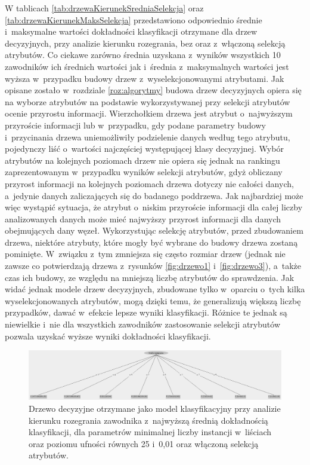 \documentclass[a4paper,twoside,12pt]{book}
\begin{document}
W tablicach \ref{tab:drzewaKierunekSredniaSelekcja} oraz \ref{tab:drzewaKierunekMaksSelekcja} przedstawiono odpowiednio średnie i~maksymalne wartości dokładności klasyfikacji otrzymane dla drzew decyzyjnych, przy analizie kierunku rozegrania, bez oraz z~włączoną selekcją atrybutów. Co ciekawe zarówno średnia uzyskana z~wyników wszystkich 10 zawodników ich średnich wartości jak i~średnia z~maksymalnych wartości jest wyższa w~przypadku budowy drzew z~wyselekcjonowanymi atrybutami. Jak opisane zostało w~rozdziale \ref{roz:algorytmy} budowa drzew decyzyjnych opiera się na wyborze atrybutów na podstawie wykorzystywanej przy selekcji atrybutów ocenie przyrostu informacji. Wierzchołkiem drzewa jest atrybut o~najwyższym przyroście informacji lub w~przypadku, gdy podane parametry budowy i~przycinania drzewa uniemożliwiły podzielenie danych według tego atrybutu, pojedynczy liść o~wartości najczęściej występującej klasy decyzyjnej. Wybór atrybutów na kolejnych poziomach drzew nie opiera się jednak na rankingu zaprezentowanym w~przypadku wyników selekcji atrybutów, gdyż obliczany przyrost informacji na kolejnych poziomach drzewa dotyczy nie całości danych, a~jedynie danych zaliczających się do badanego poddrzewa. Jak najbardziej może więc wystąpić sytuacja, że atrybut o~niskim przyroście informacji dla całej liczby analizowanych danych może mieć najwyższy przyrost informacji dla danych obejmujących dany węzeł. Wykorzystując selekcję atrybutów, przed zbudowaniem drzewa, niektóre atrybuty, które mogły być wybrane do budowy drzewa zostaną pominięte. W~związku z~tym zmniejsza się często rozmiar drzew (jednak nie zawsze co potwierdzają drzewa z~rysunków \ref{fig:drzewo1} i~\ref{fig:drzewo3}), a~także czas ich budowy, ze względu na mniejszą liczbę atrybutów do sprawdzenia. Jak widać jednak modele drzew decyzyjnych, zbudowane tylko w~oparciu o~tych kilka wyselekcjonowanych atrybutów, mogą dzięki temu, że generalizują większą liczbę przypadków, dawać w~efekcie lepsze wyniki klasyfikacji. Różnice te jednak są niewielkie i~nie dla wszystkich zawodników zastosowanie selekcji atrybutów pozwala uzyskać wyższe wyniki dokładności klasyfikacji.

\begin{figure}
\centering
\includegraphics[width=\columnwidth]{drzewoMale}
\caption{Drzewo decyzyjne otrzymane jako model klasyfikacyjny przy analizie kierunku rozegrania zawodnika z~najwyższą średnią dokładnością klasyfikacji, dla parametrów minimalnej liczby instancji w~liściach oraz poziomu ufności równych 25 i~0,01 oraz włączoną selekcją atrybutów.}
\label{fig:drzewo5}
\end{figure}
\end{document}
